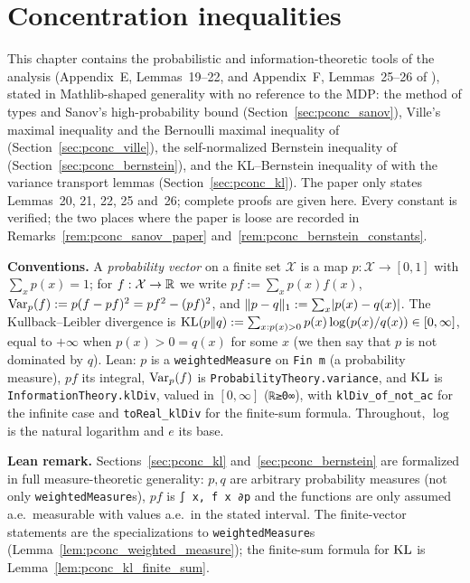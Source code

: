 \chapter{Concentration inequalities}
\label{chap:pre_concentration}

This chapter contains the probabilistic and information-theoretic tools of the analysis
(Appendix~E, Lemmas~19--22, and Appendix~F, Lemmas~25--26 of \cite{essakine2026tight}), stated in
Mathlib-shaped generality with no reference to the MDP: the method of types and Sanov's
high-probability bound (Section~\ref{sec:pconc_sanov}), Ville's maximal inequality and the
Bernoulli maximal inequality of \cite{dann2017unifying} (Section~\ref{sec:pconc_ville}), the
self-normalized Bernstein inequality of \cite{menard2021fast} (Section~\ref{sec:pconc_bernstein}),
and the KL--Bernstein inequality of \cite{talebi2018variance} with the variance transport lemmas
(Section~\ref{sec:pconc_kl}). The paper only states Lemmas~20, 21, 22, 25 and~26; complete proofs
are given here. Every constant is verified; the two places where the paper is loose are recorded
in Remarks~\ref{rem:pconc_sanov_paper} and~\ref{rem:pconc_bernstein_constants}.

\textbf{Conventions.} A \emph{probability vector} on a finite set $\mathcal X$ is a map
$p : \mathcal X \to [0, 1]$ with $\sum_x p(x) = 1$; for $f : \mathcal X \to \mathbb{R}$ we write
$pf := \sum_x p(x) f(x)$, $\operatorname{Var}_p(f) := p(f - pf)^2 = pf^2 - (pf)^2$, and
$\lVert p - q \rVert_1 := \sum_x \lvert p(x) - q(x) \rvert$. The Kullback--Leibler divergence is
$\mathrm{KL}(p \| q) := \sum_{x : p(x) > 0} p(x) \log(p(x)/q(x)) \in [0, \infty]$, equal to $+\infty$ when
$p(x) > 0 = q(x)$ for some $x$ (we then say that $p$ is not dominated by $q$). Lean: $p$ is a
\texttt{weightedMeasure} on \texttt{Fin m} (a probability measure), $pf$ its integral,
$\operatorname{Var}_p(f)$ is \texttt{ProbabilityTheory.variance}, and $\mathrm{KL}$ is
\texttt{InformationTheory.klDiv}, valued in $[0, \infty]$ (\texttt{ℝ≥0∞}), with
\texttt{klDiv\_of\_not\_ac} for the infinite case and \texttt{toReal\_klDiv} for the finite-sum
formula. Throughout, $\log$ is the natural logarithm and $e$ its base.

\textbf{Lean remark.} Sections~\ref{sec:pconc_kl} and~\ref{sec:pconc_bernstein} are formalized in
full measure-theoretic generality: $p, q$ are arbitrary probability measures (not only
\texttt{weightedMeasure}s), $pf$ is \texttt{∫ x, f x ∂p} and the functions are only assumed
a.e.\ measurable with values a.e.\ in the stated interval. The finite-vector statements are the
specializations to \texttt{weightedMeasure}s (Lemma~\ref{lem:pconc_weighted_measure}); the
finite-sum formula for $\mathrm{KL}$ is Lemma~\ref{lem:pconc_kl_finite_sum}.

